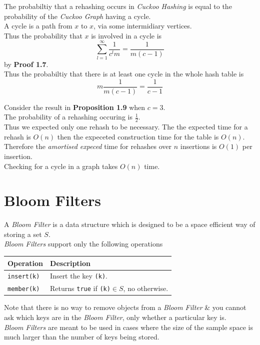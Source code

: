 \documentclass[11pt,a4paper]{article}
\begin{document}
The probabiltiy that a rehashing occurs in \textit{Cuckoo Hashing} is equal to the probability of the \textit{Cuckoo Graph} having a cycle.\\
A cycle is a path from $x$ to $x$, via some intermidiary vertices.\\
Thus the probability that $x$ is involved in a cycle is
$$\sum_{l=1}^\infty\frac1{c^lm}=\frac1{m(c-1)}$$
by \textbf{Proof 1.7}.\\
Thus the probabiltiy that there is at least one cycle in the whole hash table is
$$m\frac1{m(c-1)}=\frac1{c-1}$$

Consider the result in \textbf{Proposition 1.9} when $c=3$.\\
The probability of a rehashing occuring is $\frac12$.\\
Thus we expected only one rehash to be necessary. The the expected time for a rehash is $O(n)$ then the expeceted construction time for the table is $O(n)$.\\
Therefore the \textit{amortised expeced} time for rehashes over $n$ insertions is $O(1)$ per insertion.\\
\nb Checking for a cycle in a graph takes $O(n)$ time.

\section{Bloom Filters}

A \textit{Bloom Filter} is a data structure which is designed to be a space efficient way of storing a set $S$.\\
\textit{Bloom Filters} support only the following operations
\begin{center}
\begin{tabular}{l|l}
\textbf{Operation}&\textbf{Description}\\\hline
\lstinline!insert(k)!&Insert the key \lstinline!(k)!.\\
\lstinline!member(k)!&Returns \lstinline!true! if \lstinline!(k)!$\in S$, no otherwise.
\end{tabular}
\end{center}
Note that there is no way to remove objects from a \textit{Bloom Filter} \& you cannot ask which keys are in the \textit{Bloom Filter}, only whether a particular key is.\\
\nb \textit{Bloom Filters} are meant to be used in cases where the size of the sample space is much larger than the number of keys being stored.\\
\end{document}
